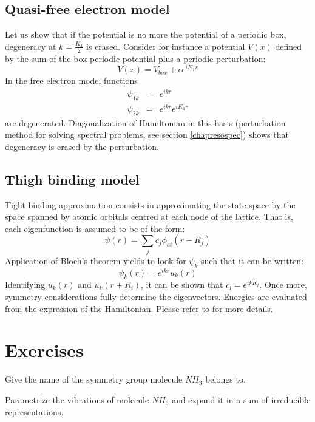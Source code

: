 \documentclass[12pt]{book}
\begin{document}
\subsection{Quasi-free electron model}
Let us show that if the potential is no more the potential of a periodic box,
degeneracy at $k=\frac{K_1}{2}$ is erased. Consider for instance a potential
$V(x)$ defined by the sum of the box periodic potential plus a periodic
perturbation: 
\begin{equation}
V(x)=V_{box}+\epsilon e^{iK_1r}
\end{equation}
In the free electron model functions
\begin{eqnarray}
\psi_{1k}&=&e^{ikr}\\
\psi_{2k}&=&e^{ikr}e^{iK_1r}
\end{eqnarray}
are degenerated. Diagonalization of Hamiltonian in this basis (perturbation
method for solving spectral problems, see section \ref{chapresospec}) shows
that degeneracy is erased by the perturbation. 
\subsection{Thigh binding model}
Tight binding approximation\cite{ph:solid:Ashcroft76}  consists in
approximating the state space by the space spanned by atomic orbitals centred
at each node of the lattice. That is, each eigenfunction is assumed to
be of the
form: 
\begin{equation}
\psi(r)=\sum_j c_j\phi_{at}(r-R_j)
\end{equation}
Application of Bloch's theorem yields to look for $\psi_k$ such that
it can be written:
\begin{equation}
\psi_k(r)=e^{ikr}u_k(r)
\end{equation}
Identifying $u_k(r)$ and $u_k(r+R_i)$, it can be shown that
$c_l=e^{ikK_l}$. Once more, symmetry considerations fully determine the
eigenvectors. Energies are evaluated from the expression of the
Hamiltonian. Please refer to 
\cite{ph:solid:Ashcroft76} for more details. 


\section{Exercises}

\begin{exo}
Give the name of the symmetry group molecule $NH_{3}$ belongs to.
\end{exo}
\begin{exo}
Parametrize the vibrations of molecule  $NH_{3}$ and expand it in a sum of
irreducible representations.
\end{exo}
\end{document}
